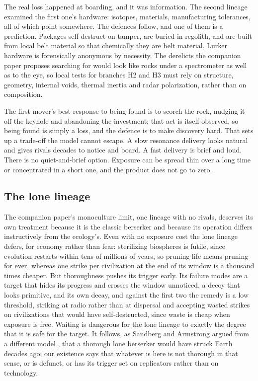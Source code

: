 \documentclass[preprint,12pt]{elsarticle}
\theoremstyle{definition}
\begin{document}
The real loss happened at boarding, and it was information. The second lineage examined the first one's hardware: isotopes, materials, manufacturing tolerances, all of which point somewhere. The defences follow, and one of them is a prediction. Packages self-destruct on tamper, are buried in regolith, and are built from local belt material so that chemically they are belt material. Lurker hardware is forensically anonymous by necessity. The derelicts the companion paper proposes searching for would look like rocks under a spectrometer as well as to the eye, so local tests for branches H2 and H3 must rely on structure, geometry, internal voids, thermal inertia and radar polarization, rather than on composition.

The first mover's best response to being found is to scorch the rock, nudging it off the keyhole and abandoning the investment; that act is itself observed, so being found is simply a loss, and the defence is to make discovery hard. That sets up a trade-off the model cannot escape. A slow resonance delivery looks natural and gives rivals decades to notice and board. A fast delivery is brief and loud. There is no quiet-and-brief option. Exposure can be spread thin over a long time or concentrated in a short one, and the product does not go to zero.

\subsection{The lone lineage}
\label{sec:berserker}

The companion paper's monoculture limit, one lineage with no rivals, deserves its own treatment because it is the classic berserker and because its operation differs instructively from the ecology's. Even with no exposure cost the lone lineage defers, for economy rather than fear: sterilizing biospheres is futile, since evolution restarts within tens of millions of years, so pruning life means pruning for ever, whereas one strike per civilization at the end of its window is a thousand times cheaper. But thoroughness pushes its trigger early. Its failure modes are a target that hides its progress and crosses the window unnoticed, a decoy that looks primitive, and its own decay, and against the first two the remedy is a low threshold, striking at radio rather than at dispersal and accepting wasted strikes on civilizations that would have self-destructed, since waste is cheap when exposure is free. Waiting is dangerous for the lone lineage to exactly the degree that it is safe for the target. It follows, as Sandberg and Armstrong argued from a different model \citep{SandbergArmstrong2013}, that a thorough lone berserker would have struck Earth decades ago; our existence says that whatever is here is not thorough in that sense, or is defunct, or has its trigger set on replicators rather than on technology.
\end{document}
